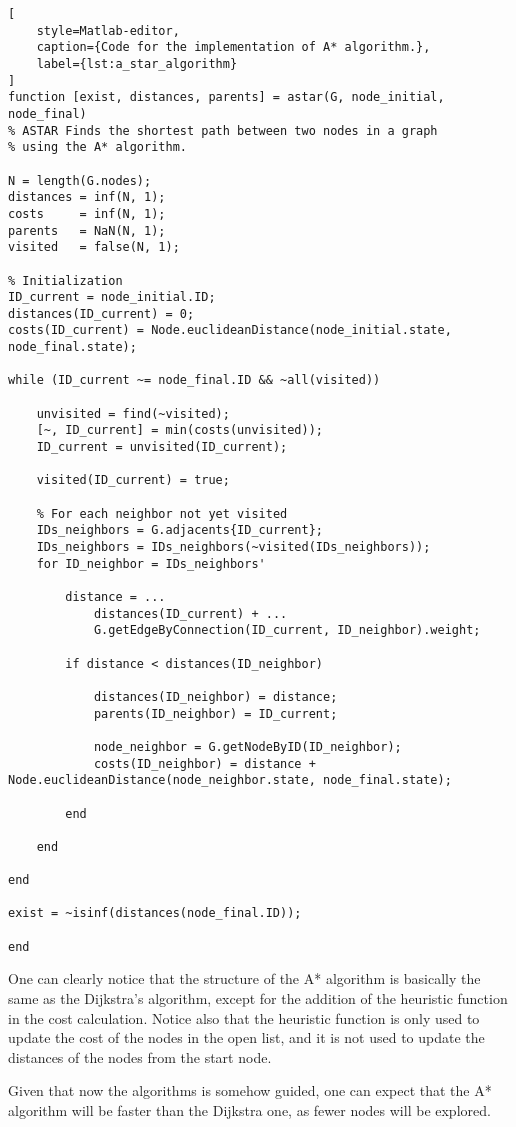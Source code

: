 \begin{lstlisting}[
    style=Matlab-editor,
    caption={Code for the implementation of A* algorithm.},
    label={lst:a_star_algorithm}
]
function [exist, distances, parents] = astar(G, node_initial, node_final)
% ASTAR Finds the shortest path between two nodes in a graph
% using the A* algorithm.

N = length(G.nodes);
distances = inf(N, 1);
costs     = inf(N, 1);
parents   = NaN(N, 1);
visited   = false(N, 1);

% Initialization
ID_current = node_initial.ID;
distances(ID_current) = 0;
costs(ID_current) = Node.euclideanDistance(node_initial.state, node_final.state);

while (ID_current ~= node_final.ID && ~all(visited))

    unvisited = find(~visited);
    [~, ID_current] = min(costs(unvisited));
    ID_current = unvisited(ID_current);

    visited(ID_current) = true;

    % For each neighbor not yet visited
    IDs_neighbors = G.adjacents{ID_current};
    IDs_neighbors = IDs_neighbors(~visited(IDs_neighbors));
    for ID_neighbor = IDs_neighbors'

        distance = ...
            distances(ID_current) + ...
            G.getEdgeByConnection(ID_current, ID_neighbor).weight;

        if distance < distances(ID_neighbor)

            distances(ID_neighbor) = distance;
            parents(ID_neighbor) = ID_current;

            node_neighbor = G.getNodeByID(ID_neighbor);
            costs(ID_neighbor) = distance + Node.euclideanDistance(node_neighbor.state, node_final.state);

        end

    end

end

exist = ~isinf(distances(node_final.ID));

end
\end{lstlisting}

One can clearly notice that the structure of the A* algorithm is basically the same as the Dijkstra's algorithm, except for the addition of the heuristic function in the cost calculation.
Notice also that the heuristic function is only used to update the cost of the nodes in the open list, and it is not used to update the distances of the nodes from the start node.

Given that now the algorithms is somehow guided, one can expect that the A* algorithm will be faster than the Dijkstra one, as fewer nodes will be explored.